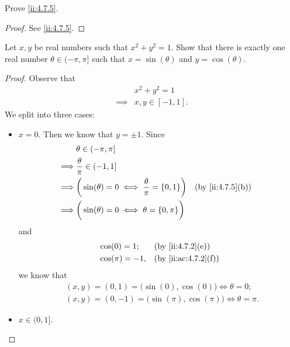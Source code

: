 \begin{ex}\label{ii:ex:4.7.3}
  Prove \cref{ii:4.7.5}.
\end{ex}

\begin{proof}
  See \cref{ii:4.7.5}.
\end{proof}

\begin{ex}\label{ii:ex:4.7.4}
  Let \(x, y\) be real numbers such that \(x^2 + y^2 = 1\).
  Show that there is exactly one real number \(\theta \in (-\pi, \pi]\) such that \(x = \sin(\theta)\) and \(y = \cos(\theta)\).
\end{ex}

\begin{proof}
  Observe that
  \begin{align*}
             & x^2 + y^2 = 1     \\
    \implies & x, y \in [-1, 1].
  \end{align*}
  We split into three cases:
  \begin{itemize}
    \item \(x = 0\).
          Then we know that \(y = \pm 1\).
          Since
          \begin{align*}
                     & \theta \in (-\pi, \pi]                                                                   \\
            \implies & \dfrac{\theta}{\pi} \in (-1, 1]                                                          \\
            \implies & \bigg(\sin(\theta) = 0 \iff \dfrac{\theta}{\pi} = \set{0, 1}\bigg) &  & \by{ii:4.7.5}[b] \\
            \implies & \bigg(\sin(\theta) = 0 \iff \theta = \set{0, \pi}\bigg)
          \end{align*}
          and
          \begin{align*}
             & \cos(0) = 1;    &  & \by{ii:4.7.2}[e]    \\
             & \cos(\pi) = -1, &  & \by{ii:ac:4.7.2}[f]
          \end{align*}
          we know that
          \begin{align*}
             & (x, y) = (0, 1) = \big(\sin(0), \cos(0)\big) \iff \theta = 0;        \\
             & (x, y) = (0, -1) = \big(\sin(\pi), \cos(\pi)\big) \iff \theta = \pi.
          \end{align*}
    \item \(x \in (0, 1]\).

\end{itemize}
\end{proof}
